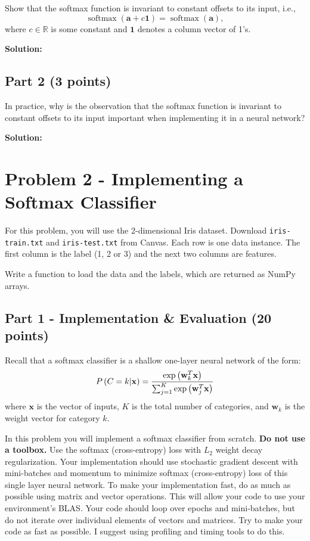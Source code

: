 \documentclass[11pt, oneside]{article}   	%
\begin{document}
Show that the softmax function is invariant to constant offsets to its input, i.e., 
\[
\operatorname{softmax} \left( {{\mathbf{a}} + {c\mathbf{1}}} \right) = \operatorname{softmax} \left( {\mathbf{a}} \right),
\]
where $c\in \mathbb{R}$ is some constant and $\mathbf{1}$ denotes a column vector of 1's.

\textbf{Solution:} \\

\subsection*{Part 2 (3 points)}
In practice, why is the observation that the softmax function is invariant to constant offsets to its input important when implementing it in a neural network?

\textbf{Solution:} \\

\section*{Problem 2 - Implementing a Softmax Classifier}

For this problem, you will use the 2-dimensional Iris dataset. Download \texttt{iris-train.txt} and \texttt{iris-test.txt} from Canvas. Each row is one data instance. The first column is the label (1, 2 or 3) and the next two columns are features.

Write a function to load the data and the labels, which are returned as NumPy arrays.


\subsection*{Part 1 - Implementation \& Evaluation (20 points)}
Recall that a softmax classifier is a shallow one-layer neural network of the form:
\begin{equation*}
P\left( {C = k|{\bf{x}}} \right) = \frac{{\exp \left( {{\bf{w}}_k^T {\bf{x}}} \right)}}
{{\sum\nolimits_{j = 1}^K {\exp \left( {{\bf{w}}_j^T {\bf{x}}} \right)} }}
\end{equation*}
where $\mathbf{x}$ is the vector of inputs, $K$ is the total number of categories, and $\mathbf{w}_k$ is the weight vector for category $k$.

In this problem you will implement a softmax classifier from scratch. \textbf{Do not use a toolbox.} Use the softmax (cross-entropy) loss with $L_2$ weight decay regularization. Your implementation should use stochastic gradient descent with mini-batches and momentum to minimize softmax (cross-entropy) loss of this single layer neural network. To make your implementation fast, do as much as possible using matrix and vector operations. This will allow your code to use your environment's BLAS. Your code should loop over epochs and mini-batches, but do not iterate over individual elements of vectors and matrices. Try to make your code as fast as possible. I suggest using profiling and timing tools to do this.
\end{document}
